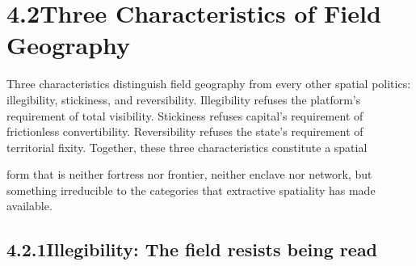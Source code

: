 \section{4.2\quad Three Characteristics of Field Geography}

Three characteristics distinguish field geography from every other spatial politics: illegibility, stickiness, and reversibility. Illegibility refuses the platform’s requirement of total visibility. Stickiness refuses capital’s requirement of frictionless convertibility. Reversibility refuses the state’s requirement of territorial fixity. Together, these three characteristics constitute a spatial

form that is neither fortress nor frontier, neither enclave nor network, but something irreducible to the categories that extractive spatiality has made available.

\subsection{4.2.1\quad Illegibility: The field resists being read}

